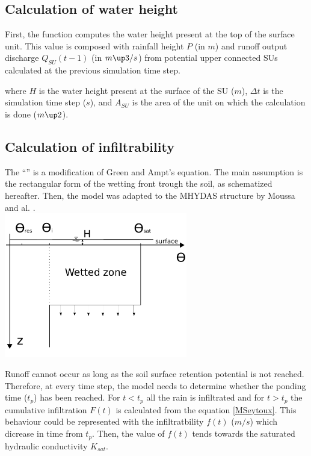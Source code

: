 \subsection{Calculation of water height}
First, the function computes the water height present at the top of the surface unit. This value is composed with rainfall height $P$ (in $m$) and runoff output discharge $Q_{SU}(t-1)$ (in $m\up3/s$) from potential upper connected SUs calculated at the previous simulation time step.



where $H$ is the water height present at the surface of the SU ($m$), $\Delta t$ is the simulation time step ($s$), and $A_{SU}$ is the area of the unit on which the calculation is done ($m\up2$).


\subsection{Calculation of infiltrability}
The ``\englishname'' \cite{MorelS1978} is a modification of Green and Ampt's \cite{Green1911} equation. The main assumption is the rectangular form of the wetting front trough the soil, as schematized hereafter. Then, the model was adapted to the MHYDAS structure by Moussa and al. \cite{Moussa2002}.\\

\includegraphics[width=8cm]{doc/common/Green_Ampt_humidity.pdf}

Runoff cannot occur as long as the soil surface retention potential is not reached. Therefore, at every time step, the model needs to determine whether the ponding time ($t_p$) has been reached. For $t < t_p$ all the rain is infiltrated and for $t > t_p$ the cumulative infiltration $F(t)$ is calculated from the equation \ref{MSeytoux}. This behaviour could be represented with the infiltratbility $f(t)$ ($m/s$) which dicrease in time from $t_p$. Then, the value of $f(t)$ tends towards the saturated hydraulic conductivity $K_{sat}$.\\


